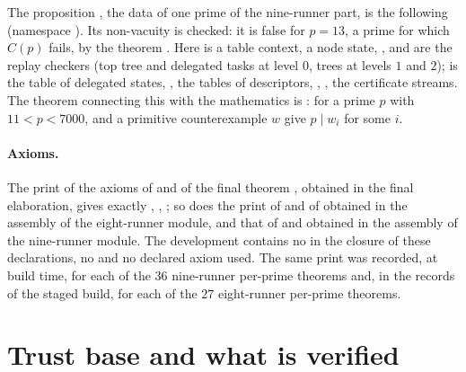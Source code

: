 \documentclass[11pt]{article}
\theoremstyle{remark}
\begin{document}
The proposition , the data of one prime of the nine-runner part, is the following (namespace ). Its non-vacuity is checked: it is false for $p=13$, a prime for which $C(p)$ fails, by the theorem .
Here  is a table context,  a node state, ,  and  are the replay checkers (top tree and delegated tasks at level $0$, trees at levels $1$ and $2$);  is the table of delegated states, ,  the tables of descriptors, , ,  the certificate streams. The theorem connecting this with the mathematics is : for a prime $p$ with $11<p<7000$,  and a primitive counterexample $w$ give $p\mid w_i$ for some $i$.

\paragraph{Axioms.} The print of the axioms of  and of the final theorem , obtained in the final elaboration, gives exactly , , ; so does the print of  and of  obtained in the assembly of the eight-runner module, and that of  and  obtained in the assembly of the nine-runner module. The development contains no  in the closure of these declarations, no  and no declared axiom used. The same print was recorded, at build time, for each of the $36$ nine-runner per-prime theorems and, in the records of the staged build, for each of the $27$ eight-runner per-prime theorems.

\section{Trust base and what is verified}\label{sec:trust}
\end{document}
